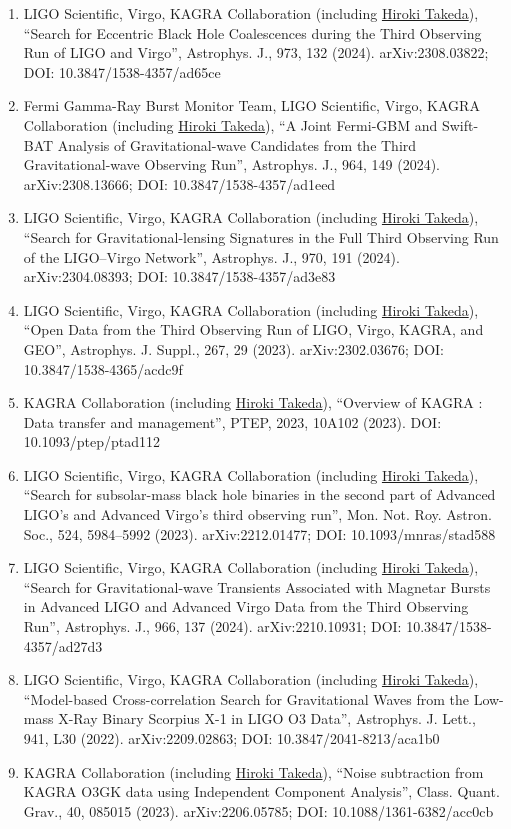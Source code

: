 \documentclass[uplatex, 11pt]{jsarticle}
\begin{document}
\begin{enumerate}
\item LIGO Scientific, Virgo, KAGRA Collaboration (including \uline{Hiroki Takeda}), “Search for Eccentric Black Hole Coalescences during the Third Observing Run of LIGO and Virgo”, Astrophys. J., 973, 132 (2024). arXiv:2308.03822; DOI: 10.3847/1538-4357/ad65ce
\item Fermi Gamma-Ray Burst Monitor Team, LIGO Scientific, Virgo, KAGRA Collaboration (including \uline{Hiroki Takeda}), “A Joint Fermi-GBM and Swift-BAT Analysis of Gravitational-wave Candidates from the Third Gravitational-wave Observing Run”, Astrophys. J., 964, 149 (2024). arXiv:2308.13666; DOI: 10.3847/1538-4357/ad1eed
\item LIGO Scientific, Virgo, KAGRA Collaboration (including \uline{Hiroki Takeda}), “Search for Gravitational-lensing Signatures in the Full Third Observing Run of the LIGO–Virgo Network”, Astrophys. J., 970, 191 (2024). arXiv:2304.08393; DOI: 10.3847/1538-4357/ad3e83
\item LIGO Scientific, Virgo, KAGRA Collaboration (including \uline{Hiroki Takeda}), “Open Data from the Third Observing Run of LIGO, Virgo, KAGRA, and GEO”, Astrophys. J. Suppl., 267, 29 (2023). arXiv:2302.03676; DOI: 10.3847/1538-4365/acdc9f
\item KAGRA Collaboration (including \uline{Hiroki Takeda}), “Overview of KAGRA : Data transfer and management”, PTEP, 2023, 10A102 (2023). DOI: 10.1093/ptep/ptad112
\item LIGO Scientific, Virgo, KAGRA Collaboration (including \uline{Hiroki Takeda}), “Search for subsolar-mass black hole binaries in the second part of Advanced LIGO's and Advanced Virgo's third observing run”, Mon. Not. Roy. Astron. Soc., 524, 5984--5992 (2023). arXiv:2212.01477; DOI: 10.1093/mnras/stad588
\item LIGO Scientific, Virgo, KAGRA Collaboration (including \uline{Hiroki Takeda}), “Search for Gravitational-wave Transients Associated with Magnetar Bursts in Advanced LIGO and Advanced Virgo Data from the Third Observing Run”, Astrophys. J., 966, 137 (2024). arXiv:2210.10931; DOI: 10.3847/1538-4357/ad27d3
\item LIGO Scientific, Virgo, KAGRA Collaboration (including \uline{Hiroki Takeda}), “Model-based Cross-correlation Search for Gravitational Waves from the Low-mass X-Ray Binary Scorpius X-1 in LIGO O3 Data”, Astrophys. J. Lett., 941, L30 (2022). arXiv:2209.02863; DOI: 10.3847/2041-8213/aca1b0
\item KAGRA Collaboration (including \uline{Hiroki Takeda}), “Noise subtraction from KAGRA O3GK data using Independent Component Analysis”, Class. Quant. Grav., 40, 085015 (2023). arXiv:2206.05785; DOI: 10.1088/1361-6382/acc0cb

\end{enumerate}
\end{document}
